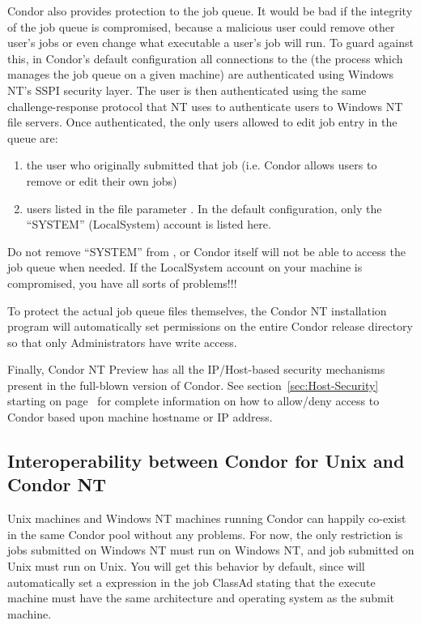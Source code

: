 Condor also provides protection to the job queue.  It would be bad if the
integrity of the job queue is compromised, because a malicious user could
remove other user's jobs or even change what executable a user's job will
run.  To guard against this, in Condor's default configuration all connections to the  (the
process which manages the job queue on a given machine) are authenticated
using Windows NT's SSPI security layer.  The user is then authenticated
using the same challenge-response protocol that NT uses to authenticate
users to Windows NT file servers.  Once authenticated, the only users
allowed to edit job entry in the queue are:
\begin{enumerate}
\item the user who originally submitted that job (i.e. Condor allows users
to remove or edit their own jobs)
\item users listed in the  file parameter
.  In the default configuration, only the
``SYSTEM'' (LocalSystem) account is listed here.  
\end{enumerate}
\Warn Do not remove ``SYSTEM'' from , or
Condor itself will not be able to access the job queue when needed.  If the
LocalSystem account on your machine is compromised, you have all sorts of
problems!!!

To protect the actual job queue files themselves, the Condor NT installation
program will automatically set permissions on the entire Condor release
directory so that only Administrators have write access.

Finally, Condor NT Preview has all the IP/Host-based security mechanisms present in the full-blown version of Condor.  See section~\ref{sec:Host-Security} starting on page~\pageref{sec:Host-Security} for complete information on how to allow/deny access to Condor based upon machine hostname or IP address.

\subsection{Interoperability between Condor for Unix and Condor NT}

Unix machines and Windows NT machines running Condor can happily co-exist in
the same Condor pool without any problems.  For now, the only restriction is jobs
submitted on Windows NT must run on Windows NT, and job submitted on Unix
must run on Unix.  You will get this behavior by default, since
 will automatically set a  expression in
the job ClassAd stating that the execute machine must have the same
architecture and operating system as the submit machine. 

